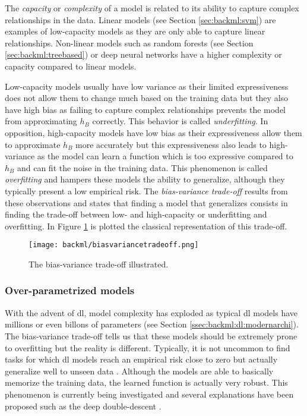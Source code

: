 The \textit{capacity} or \textit{complexity} of a model is related to its ability to capture complex relationships in the data. Linear models (see Section \ref{sec:backml:svm}) are examples of low-capacity models as they are only able to capture linear relationships. Non-linear models such as random forests (see Section \ref{sec:backml:treebased}) or deep neural networks have a higher complexity or capacity compared to linear models. 

Low-capacity models usually have low variance as their limited expressiveness does not allow them to change much based on the training data but they also have high bias as failing to capture complex relationships prevents the model from approximating $h_B$ correctly. This behavior is called \textit{underfitting}. In opposition, high-capacity models have low bias as their expressiveness allow them to approximate $h_B$ more accurately but this expressiveness also leads to high-variance as the model can learn a function which is too expressive compared to $h_B$ and can fit the noise in the training data. This phenomenon is called \textit{overfitting} and hampers these models the ability to generalize, although they typically present a low empirical risk. The \textit{bias-variance trade-off} results from these observations and states that finding a model that generalizes consists in finding the trade-off between low- and high-capacity or underfitting and overfitting. In Figure \ref{fig:backml:biasvariancetradeoff} is plotted the classical representation of this trade-off.

\begin{figure}
  \centering
  \texttt{[image: backml/biasvariancetradeoff.png]}
  \caption{The bias-variance trade-off illustrated.}
  \label{fig:backml:biasvariancetradeoff}
\end{figure}

\subsubsection{Over-parametrized models}

With the advent of \acrlong{dl}, model complexity has exploded as typical \acrlong{dl} models have millions or even billons of parameters (see Section \ref{ssec:backml:dl:modernarchi}). The bias-variance trade-off tells us that these models should be extremely prone to overfitting but the reality is different. Typically, it is not uncommon to find tasks for which \acrlong{dl} models reach an empirical risk close to zero but actually generalize well to unseen data \parencite{zhang2021understanding}. Although the models are able to basically memorize the training data, the learned function is actually very robust. This phenomenon is currently being investigated and several explanations have been proposed such as the deep double-descent \parencite{belkin2019reconciling}.

